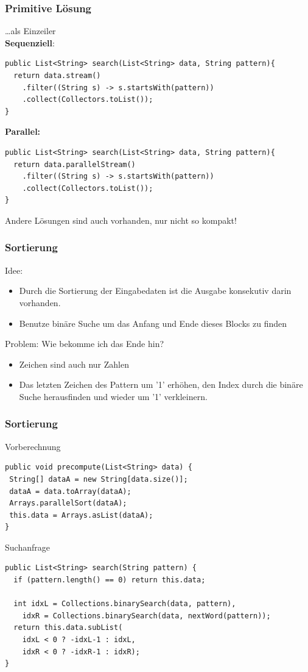 \documentclass[11pt, xcolor=dvipsnames]{beamer}
\begin{document}
\begin{frame}[fragile]
	\frametitle{Primitive Lösung}
	\ldots als Einzeiler\\
	\textbf{Sequenziell}:
	
	\begin{lstlisting}
public List<String> search(List<String> data, String pattern){
  return data.stream()
    .filter((String s) -> s.startsWith(pattern))
    .collect(Collectors.toList());
}
	\end{lstlisting}
	\textbf{Parallel:}
		\begin{lstlisting}
public List<String> search(List<String> data, String pattern){
  return data.parallelStream()
    .filter((String s) -> s.startsWith(pattern))
    .collect(Collectors.toList());
}
		\end{lstlisting}

Andere Lösungen sind auch vorhanden, nur nicht so kompakt!
\end{frame}

	\begin{frame}
	\frametitle{Sortierung}
	Idee:
	\begin{itemize}
		\item Durch die Sortierung der Eingabedaten ist die Ausgabe konsekutiv darin vorhanden. 
		\item Benutze binäre Suche um das Anfang und Ende dieses Blocks zu finden
	\end{itemize}
	Problem: Wie bekomme ich das Ende hin?
	\begin{itemize}
		\item Zeichen sind auch nur Zahlen
		\item Das letzten Zeichen des Pattern um '1' erhöhen, den Index durch die binäre Suche herausfinden und wieder um '1' verkleinern.  
	\end{itemize}		
	\end{frame}
	
\begin{frame}[fragile]
	\frametitle{Sortierung}
	Vorberechnung
	\begin{lstlisting}
public void precompute(List<String> data) {
 String[] dataA = new String[data.size()];
 dataA = data.toArray(dataA);
 Arrays.parallelSort(dataA);
 this.data = Arrays.asList(dataA);		
}	
	\end{lstlisting}
	Suchanfrage
	\begin{lstlisting}
public List<String> search(String pattern) {
  if (pattern.length() == 0) return this.data;
	
  int idxL = Collections.binarySearch(data, pattern),
    idxR = Collections.binarySearch(data, nextWord(pattern));
  return this.data.subList(
	idxL < 0 ? -idxL-1 : idxL, 
	idxR < 0 ? -idxR-1 : idxR);
}
	\end{lstlisting}
\end{frame}
\end{document}
